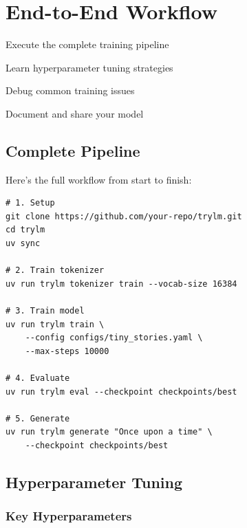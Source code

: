 \chapter{End-to-End Workflow}
\label{ch:end-to-end}

\begin{objectives}
    \item Execute the complete training pipeline
    \item Learn hyperparameter tuning strategies
    \item Debug common training issues
    \item Document and share your model
\end{objectives}

\section{Complete Pipeline}

Here's the full workflow from start to finish:

\begin{lstlisting}[style=shell]
# 1. Setup
git clone https://github.com/your-repo/trylm.git
cd trylm
uv sync

# 2. Train tokenizer
uv run trylm tokenizer train --vocab-size 16384

# 3. Train model
uv run trylm train \
    --config configs/tiny_stories.yaml \
    --max-steps 10000

# 4. Evaluate
uv run trylm eval --checkpoint checkpoints/best

# 5. Generate
uv run trylm generate "Once upon a time" \
    --checkpoint checkpoints/best
\end{lstlisting}

\section{Hyperparameter Tuning}

\subsection{Key Hyperparameters}

